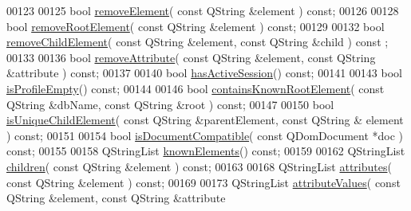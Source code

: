 \begin{DoxyCode}
00123 
00125   \textcolor{keywordtype}{bool} \hyperlink{class_g_c_data_base_interface_ad8aa20de89390f0cc2a1b64270a831b3}{removeElement}( \textcolor{keyword}{const} QString &element ) \textcolor{keyword}{const};
00126 
00128   \textcolor{keywordtype}{bool} \hyperlink{class_g_c_data_base_interface_adbace3a2d395dae9cd915238556a6f77}{removeRootElement}( \textcolor{keyword}{const} QString &element ) \textcolor{keyword}{const};
00129 
00132   \textcolor{keywordtype}{bool} \hyperlink{class_g_c_data_base_interface_a657f2885b6741f8ac229939f77e7dd73}{removeChildElement}( \textcolor{keyword}{const} QString &element, \textcolor{keyword}{const} QString &child ) \textcolor{keyword}{const}
      ;
00133 
00136   \textcolor{keywordtype}{bool} \hyperlink{class_g_c_data_base_interface_a6fbf551a825c0fca13926449be4a5215}{removeAttribute}( \textcolor{keyword}{const} QString &element, \textcolor{keyword}{const} QString &attribute ) \textcolor{keyword}{
      const};
00137 
00140   \textcolor{keywordtype}{bool} \hyperlink{class_g_c_data_base_interface_a875e3999c9d91b5e0f59be8bdef54408}{hasActiveSession}() \textcolor{keyword}{const};
00141 
00143   \textcolor{keywordtype}{bool} \hyperlink{class_g_c_data_base_interface_ae570c403f1b6b7f85e6a5c46829f42a8}{isProfileEmpty}() \textcolor{keyword}{const};
00144 
00146   \textcolor{keywordtype}{bool} \hyperlink{class_g_c_data_base_interface_a91183c2d227bf90d0d26fccc1e4ae878}{containsKnownRootElement}( \textcolor{keyword}{const} QString &dbName, \textcolor{keyword}{const} QString &root ) \textcolor{keyword}{
      const};
00147 
00150   \textcolor{keywordtype}{bool} \hyperlink{class_g_c_data_base_interface_a94559ea23489e360757db42c50d3a261}{isUniqueChildElement}( \textcolor{keyword}{const} QString &parentElement, \textcolor{keyword}{const} QString &
      element ) \textcolor{keyword}{const};
00151 
00154   \textcolor{keywordtype}{bool} \hyperlink{class_g_c_data_base_interface_ae16d516cbefe58ccf9ef0e8ece4a394f}{isDocumentCompatible}( \textcolor{keyword}{const} QDomDocument *doc ) \textcolor{keyword}{const};
00155 
00158   QStringList \hyperlink{class_g_c_data_base_interface_a6c4eabd4f39a1c23ab320bb0dbc855d4}{knownElements}() \textcolor{keyword}{const};
00159 
00162   QStringList \hyperlink{class_g_c_data_base_interface_aab5126783bc3acc7c718c8ffd8af62bc}{children}( \textcolor{keyword}{const} QString &element ) \textcolor{keyword}{const};
00163 
00168   QStringList \hyperlink{class_g_c_data_base_interface_afb1e49e08f98ca453f9ac66340a35642}{attributes}( \textcolor{keyword}{const} QString &element ) \textcolor{keyword}{const};
00169 
00173   QStringList \hyperlink{class_g_c_data_base_interface_a329e17f6c02c62fd554884f2b5a7e2df}{attributeValues}( \textcolor{keyword}{const} QString &element, \textcolor{keyword}{const} QString &attribute

\end{DoxyCode}
